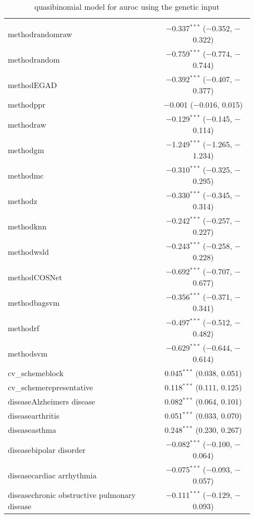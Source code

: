 
\begin{table}[!htbp] \centering 
  \caption{quasibinomial model for auroc using the genetic input} 
  \label{} 
\begin{tabular}{@{\extracolsep{5pt}}lc} 
\\[-1.8ex]\hline 
\hline \\[-1.8ex] 
 methodrandomraw & $-$0.337$^{***}$ ($-$0.352, $-$0.322) \\ 
  methodrandom & $-$0.759$^{***}$ ($-$0.774, $-$0.744) \\ 
  methodEGAD & $-$0.392$^{***}$ ($-$0.407, $-$0.377) \\ 
  methodppr & $-$0.001 ($-$0.016, 0.015) \\ 
  methodraw & $-$0.129$^{***}$ ($-$0.145, $-$0.114) \\ 
  methodgm & $-$1.249$^{***}$ ($-$1.265, $-$1.234) \\ 
  methodmc & $-$0.310$^{***}$ ($-$0.325, $-$0.295) \\ 
  methodz & $-$0.330$^{***}$ ($-$0.345, $-$0.314) \\ 
  methodknn & $-$0.242$^{***}$ ($-$0.257, $-$0.227) \\ 
  methodwsld & $-$0.243$^{***}$ ($-$0.258, $-$0.228) \\ 
  methodCOSNet & $-$0.692$^{***}$ ($-$0.707, $-$0.677) \\ 
  methodbagsvm & $-$0.356$^{***}$ ($-$0.371, $-$0.341) \\ 
  methodrf & $-$0.497$^{***}$ ($-$0.512, $-$0.482) \\ 
  methodsvm & $-$0.629$^{***}$ ($-$0.644, $-$0.614) \\ 
  cv\_schemeblock & 0.045$^{***}$ (0.038, 0.051) \\ 
  cv\_schemerepresentative & 0.118$^{***}$ (0.111, 0.125) \\ 
  diseaseAlzheimers disease & 0.082$^{***}$ (0.064, 0.101) \\ 
  diseasearthritis & 0.051$^{***}$ (0.033, 0.070) \\ 
  diseaseasthma & 0.248$^{***}$ (0.230, 0.267) \\ 
  diseasebipolar disorder & $-$0.082$^{***}$ ($-$0.100, $-$0.064) \\ 
  diseasecardiac arrhythmia & $-$0.075$^{***}$ ($-$0.093, $-$0.057) \\ 
  diseasechronic obstructive pulmonary disease & $-$0.111$^{***}$ ($-$0.129, $-$0.093) \\ 

\end{tabular}
\end{table}
